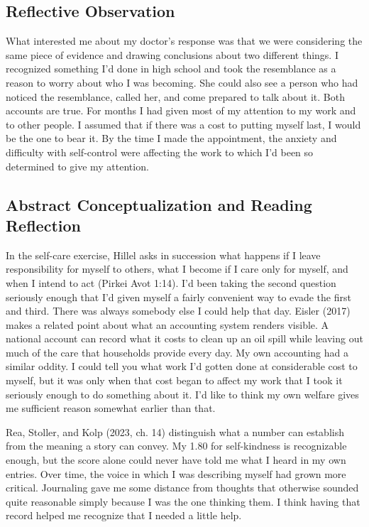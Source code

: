 \documentclass[12pt,letterpaper]{article}
\begin{document}
\subsection{Reflective Observation}
What interested me about my doctor's response was that we were considering the same piece of evidence and drawing conclusions about two different things. I recognized something I'd done in high school and took the resemblance as a reason to worry about who I was becoming. She could also see a person who had noticed the resemblance, called her, and come prepared to talk about it. Both accounts are true. For months I had given most of my attention to my work and to other people. I assumed that if there was a cost to putting myself last, I would be the one to bear it. By the time I made the appointment, the anxiety and difficulty with self-control were affecting the work to which I'd been so determined to give my attention.

\subsection{Abstract Conceptualization and Reading Reflection}
In the self-care exercise, Hillel asks in succession what happens if I leave responsibility for myself to others, what I become if I care only for myself, and when I intend to act (Pirkei Avot 1:14). I'd been taking the second question seriously enough that I'd given myself a fairly convenient way to evade the first and third. There was always somebody else I could help that day. Eisler (2017) makes a related point about what an accounting system renders visible. A national account can record what it costs to clean up an oil spill while leaving out much of the care that households provide every day. My own accounting had a similar oddity. I could tell you what work I'd gotten done at considerable cost to myself, but it was only when that cost began to affect my work that I took it seriously enough to do something about it. I'd like to think my own welfare gives me sufficient reason somewhat earlier than that.

Rea, Stoller, and Kolp (2023, ch. 14) distinguish what a number can establish from the meaning a story can convey. My 1.80 for self-kindness is recognizable enough, but the score alone could never have told me what I heard in my own entries. Over time, the voice in which I was describing myself had grown more critical. Journaling gave me some distance from thoughts that otherwise sounded quite reasonable simply because I was the one thinking them. I think having that record helped me recognize that I needed a little help.
\end{document}
